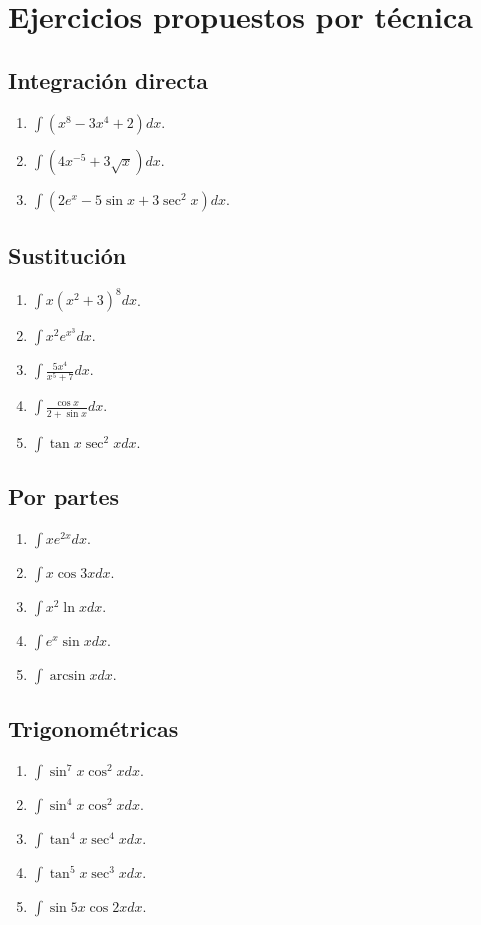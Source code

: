 \documentclass[12pt]{article}
\theoremstyle{definition}
\theoremstyle{remark}
\begin{document}
\section{Ejercicios propuestos por técnica}
\subsection*{Integración directa}
\begin{enumerate}
\item $\int(x^8-3x^4+2)dx$.
\item $\int(4x^{-5}+3\sqrt{x})dx$.
\item $\int(2e^x-5\sin x+3\sec^2x)dx$.
\end{enumerate}
\subsection*{Sustitución}
\begin{enumerate}
\item $\int x(x^2+3)^8dx$.
\item $\int x^2e^{x^3}dx$.
\item $\int\frac{5x^4}{x^5+7}dx$.
\item $\int\frac{\cos x}{2+\sin x}dx$.
\item $\int\tan x\sec^2x dx$.
\end{enumerate}
\subsection*{Por partes}
\begin{enumerate}
\item $\int xe^{2x}dx$.
\item $\int x\cos3x dx$.
\item $\int x^2\ln xdx$.
\item $\int e^x\sin xdx$.
\item $\int\arcsin xdx$.
\end{enumerate}
\subsection*{Trigonométricas}
\begin{enumerate}
\item $\int\sin^7x\cos^2xdx$.
\item $\int\sin^4x\cos^2xdx$.
\item $\int\tan^4x\sec^4xdx$.
\item $\int\tan^5x\sec^3xdx$.
\item $\int\sin5x\cos2xdx$.
\end{enumerate}
\end{document}
